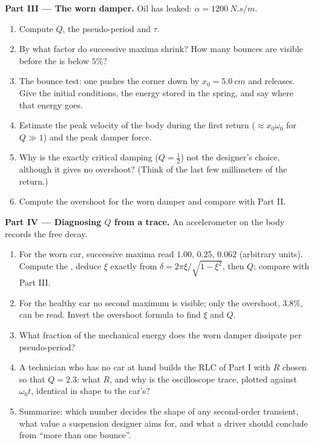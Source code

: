 \begin{problem}
\medskip
\noindent\textbf{Part III --- The worn damper.}
Oil has leaked: $\alpha = \qty{1200}{N.s/m}$.
\begin{enumerate}[resume]
  \item Compute $Q$, the pseudo-period and $\tau$.
  \item By what factor do successive maxima shrink? How many bounces
        are visible before the  is below $5\%$?
  \item The bounce test: one pushes the corner down by $x_0 =
        \qty{5.0}{cm}$ and releases. Give the initial conditions, the
        energy stored in the spring, and say where that energy goes.
  \item Estimate the peak velocity of the body during the first
        return ($\approx x_0\omega_0$ for $Q \gg 1$) and the peak damper
        force.
  \item Why is the exactly critical damping ($Q = \tfrac12$) not the
        designer's choice, although it gives no overshoot? (Think of
        the last few millimeters of the return.)
  \item Compute the overshoot for the worn damper and compare with
        Part II.
\end{enumerate}

\medskip
\noindent\textbf{Part IV --- Diagnosing $Q$ from a trace.}
An accelerometer on the body records the free decay.
\begin{enumerate}[resume]
  \item For the worn car, successive maxima read $1.00$, $0.25$, $0.062$
        (arbitrary units). Compute the , deduce
        $\xi$ exactly from $\delta = 2\pi\xi/\sqrt{1 - \xi^2}$, then $Q$;
        compare with Part III.
  \item For the healthy car no second maximum is visible; only the
        overshoot, $3.8\%$, can be read. Invert the overshoot formula to
        find $\xi$ and $Q$.
  \item What fraction of the mechanical energy does the worn damper
        dissipate per pseudo-period?
  \item A technician who has no car at hand builds the RLC of Part I
        with $R$ chosen so that $Q = 2.3$: what $R$, and why is the
        oscilloscope trace, plotted against $\omega_0 t$, identical in
        shape to the car's?
  \item Summarize: which  number decides the shape of any
        second-order transient, what value a suspension designer aims
        for, and what a driver should conclude from ``more than one
        bounce''.
\end{enumerate}
\end{problem}
